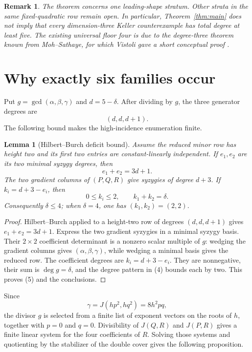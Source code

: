 \documentclass[11pt]{article}
\newtheorem{lemma}[theorem]{Lemma}
\newtheorem{remark}[theorem]{Remark}
\begin{document}
\begin{remark}
The theorem concerns one leading-shape stratum.  Other strata in the same
fixed-quadratic row remain open.  In particular, Theorem~\ref{thm:main}
does not imply that every dimension-three Keller counterexample has total
degree at least five.  The existing universal floor four is due to the
degree-three theorem known from Moh--Sathaye, for which Vistoli gave a short
conceptual proof \cite{Vistoli1999}.
\end{remark}

\section{Why exactly six families occur}

Put \(g=\gcd(\alpha,\beta,\gamma)\) and \(d=5-\delta\).  After dividing
by \(g\), the three generator degrees are
\[
(d,d,d+1).
\tag{4}
\]
The following bound makes the high-incidence enumeration finite.

\begin{lemma}[Hilbert--Burch deficit bound]\label{lem:hb}
Assume the reduced minor row has height two and its first two entries are
constant-linearly independent.  If \(e_1,e_2\) are its two minimal
syzygy degrees, then
\[
e_1+e_2=3d+1.
\]
The two gradient columns of \((P,Q,R)\) give syzygies of degree \(d+3\).
If \(k_i=d+3-e_i\), then
\[
0\le k_i\le2,\qquad k_1+k_2=\delta.
\tag{5}
\]
Consequently \(\delta\le4\); when \(\delta=4\), one has
\((k_1,k_2)=(2,2)\).
\end{lemma}

\begin{proof}
Hilbert--Burch applied to a height-two row of degrees \((d,d,d+1)\)
gives \(e_1+e_2=3d+1\).  Express the two gradient syzygies in a minimal
syzygy basis.  Their \(2\times2\) coefficient determinant is a nonzero
scalar multiple of \(g\): wedging the gradient columns gives
\((\alpha,\beta,\gamma)\), while wedging a minimal basis gives the reduced
row.  The coefficient degrees are \(k_i=d+3-e_i\).  They are nonnegative,
their sum is \(\deg g=\delta\), and the degree pattern in (4) bounds each
by two.  This proves (5) and the conclusions.
\end{proof}

Since
\[
\gamma=J(hp^2,hq^2)=8h^2pq,
\tag{6}
\]
the divisor \(g\) is selected from a finite list of exponent vectors on
the roots of \(h\), together with \(p=0\) and \(q=0\).  Divisibility of
\(J(Q,R)\) and \(J(P,R)\) gives a finite linear system for the four
coefficients of \(R\).  Solving those systems and quotienting by the
stabilizer of the double cover gives the following proposition.
\end{document}
